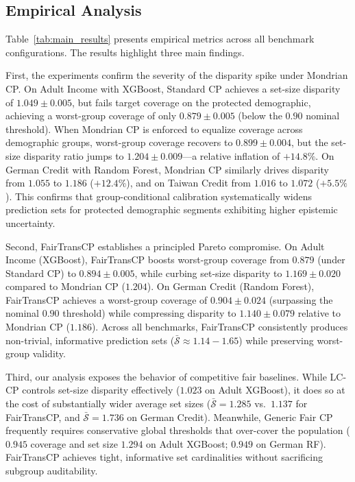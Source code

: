 \documentclass[twoside]{article}
\begin{document}
\subsection{Empirical Analysis}
Table~\ref{tab:main_results} presents empirical metrics across all benchmark configurations. The results highlight three main findings.

First, the experiments confirm the severity of the disparity spike under Mondrian CP. On Adult Income with XGBoost, Standard CP achieves a set-size disparity of $1.049 \pm 0.005$, but fails target coverage on the protected demographic, achieving a worst-group coverage of only $0.879 \pm 0.005$ (below the $0.90$ nominal threshold). When Mondrian CP is enforced to equalize coverage across demographic groups, worst-group coverage recovers to $0.899 \pm 0.004$, but the set-size disparity ratio jumps to $1.204 \pm 0.009$---a relative inflation of $+14.8\%$. On German Credit with Random Forest, Mondrian CP similarly drives disparity from $1.055$ to $1.186$ ($+12.4\%$), and on Taiwan Credit from $1.016$ to $1.072$ ($+5.5\%$). This confirms that group-conditional calibration systematically widens prediction sets for protected demographic segments exhibiting higher epistemic uncertainty.

Second, FairTransCP establishes a principled Pareto compromise. On Adult Income (XGBoost), FairTransCP boosts worst-group coverage from $0.879$ (under Standard CP) to $0.894 \pm 0.005$, while curbing set-size disparity to $1.169 \pm 0.020$ compared to Mondrian CP ($1.204$). On German Credit (Random Forest), FairTransCP achieves a worst-group coverage of $0.904 \pm 0.024$ (surpassing the nominal $0.90$ threshold) while compressing disparity to $1.140 \pm 0.079$ relative to Mondrian CP ($1.186$). Across all benchmarks, FairTransCP consistently produces non-trivial, informative prediction sets ($\bar{\mathcal{S}} \approx 1.14 - 1.65$) while preserving worst-group validity.

Third, our analysis exposes the behavior of competitive fair baselines. While LC-CP \citep{liu2024label} controls set-size disparity effectively ($1.023$ on Adult XGBoost), it does so at the cost of substantially wider average set sizes ($\bar{\mathcal{S}} = 1.285$ vs.\ $1.137$ for FairTransCP, and $\bar{\mathcal{S}} = 1.736$ on German Credit). Meanwhile, Generic Fair CP \citep{maneriker2025fair} frequently requires conservative global thresholds that over-cover the population ($0.945$ coverage and set size $1.294$ on Adult XGBoost; $0.949$ on German RF). FairTransCP achieves tight, informative set cardinalities without sacrificing subgroup auditability.
\end{document}
